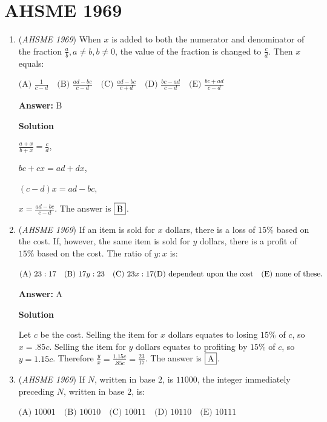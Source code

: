 \section{AHSME 1969}
        \begin{enumerate}
        	\item (\textit{AHSME 1969}) When $x$ is added to both the numerator and denominator of the fraction 
$\frac{a}{b},a \ne b,b \ne 0$, the value of the fraction is changed to $\frac{c}{d}$. 
Then $x$ equals:


 $\text{(A) } \frac{1}{c-d}\quad \text{(B) } \frac{ad-bc}{c-d}\quad \text{(C) } \frac{ad-bc}{c+d}\quad \text{(D) }\frac{bc-ad}{c-d} \quad \text{(E) } \frac{bc+ad}{c-d}$

 \textbf{Answer: }B



\textbf{Solution}

$\frac{a+x}{b+x}=\frac{c}{d}$,

 $bc+cx=ad+dx$,

 $(c-d)x=ad-bc$,

 $x=\frac{ad-bc}{c-d}$. The answer is $\fbox{B}$.

 


	\item (\textit{AHSME 1969}) If an item is sold for $x$ dollars, there is a loss of $15\%$ based on the cost. If, however, the same item is sold for $y$ dollars, there is a profit of $15\%$ based on the cost. The ratio of $y:x$ is:


 $\text{(A) } 23:17\quad \text{(B) } 17y:23\quad \text{(C) } 23x:17\quad \\ \text{(D) dependent upon the cost} \quad \text{(E) none of these.}$

 \textbf{Answer: }A



\textbf{Solution}

Let $c$ be the cost. Selling the item for $x$ dollars equates to losing $15\%$ of $c$, so $x=.85c$. Selling the item for $y$ dollars equates to profiting by $15\%$ of $c$, so $y=1.15c$. Therefore $\frac{y}{x}=\frac{1.15c}{.85c}=\frac{23}{17}$. The answer is $\fbox{A}$.

 


	\item (\textit{AHSME 1969}) If $N$, written in base $2$, is $11000$, the integer immediately preceding $N$, written in base $2$, is:


 $\text{(A) } 10001\quad \text{(B) } 10010\quad \text{(C) } 10011\quad \text{(D) } 10110\quad \text{(E) } 10111$


\end{enumerate}
